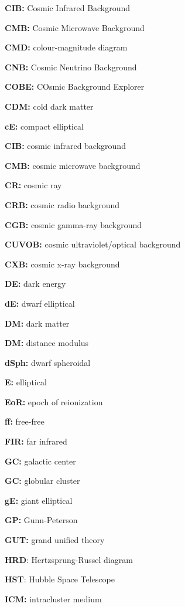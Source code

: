 \documentclass[a4paper,11pt]{article}
\begin{document}
{\noindent}\textbf{CIB:} Cosmic Infrared Background

{\noindent}\textbf{CMB:} Cosmic Microwave Background

{\noindent}\textbf{CMD:} colour-magnitude diagram

{\noindent}\textbf{CNB:} Cosmic Neutrino Background

{\noindent}\textbf{COBE:} COsmic Background Explorer

{\noindent}\textbf{CDM:} cold dark matter

{\noindent}\textbf{cE:} compact elliptical

{\noindent}\textbf{CIB:} cosmic infrared background

{\noindent}\textbf{CMB:} cosmic microwave background

{\noindent}\textbf{CR:} cosmic ray

{\noindent}\textbf{CRB:} cosmic radio background

{\noindent}\textbf{CGB:} cosmic gamma-ray background

{\noindent}\textbf{CUVOB:} cosmic ultraviolet/optical background

{\noindent}\textbf{CXB:} cosmic x-ray background

{\noindent}\textbf{DE:} dark energy

{\noindent}\textbf{dE:} dwarf elliptical

{\noindent}\textbf{DM:} dark matter

{\noindent}\textbf{DM:} distance modulus

{\noindent}\textbf{dSph:} dwarf spheroidal

{\noindent}\textbf{E:} elliptical

{\noindent}\textbf{EoR:} epoch of reionization

{\noindent}\textbf{ff:} free-free

{\noindent}\textbf{FIR:} far infrared

{\noindent}\textbf{GC:} galactic center

{\noindent}\textbf{GC:} globular cluster

{\noindent}\textbf{gE:} giant elliptical

{\noindent}\textbf{GP:} Gunn-Peterson

{\noindent}\textbf{GUT:} grand unified theory

{\noindent}\textbf{HRD}: Hertzsprung-Russel diagram

{\noindent}\textbf{HST}: Hubble Space Telescope

{\noindent}\textbf{ICM:} intracluster medium
\end{document}
